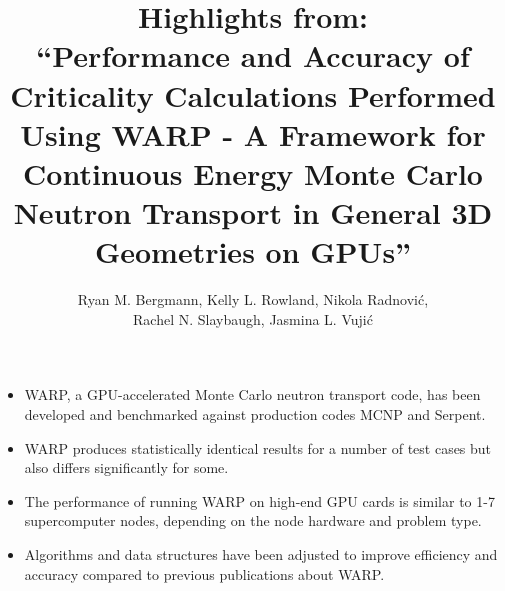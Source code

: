 \documentclass{article}
\begin{document}

\title{Highlights from:\\ ``Performance and Accuracy of Criticality Calculations Performed Using WARP - A Framework for Continuous Energy Monte Carlo Neutron Transport in General 3D Geometries on GPUs''}
\author{Ryan M. Bergmann, Kelly L. Rowland, Nikola Radnovi\'c, \\ Rachel N. Slaybaugh, Jasmina L. Vuji\'c}
\maketitle

\begin{itemize}
\item WARP, a GPU-accelerated Monte Carlo neutron transport code, has been developed and benchmarked against production codes MCNP and Serpent.
\item WARP produces statistically identical results for a number of test cases but also differs significantly for some.
\item The performance of running WARP on high-end GPU cards is similar to 1-7 supercomputer nodes, depending on the node hardware and problem type.
\item Algorithms and data structures have been adjusted to improve efficiency and accuracy compared to previous publications about WARP.
\end{itemize}
\end{document}

